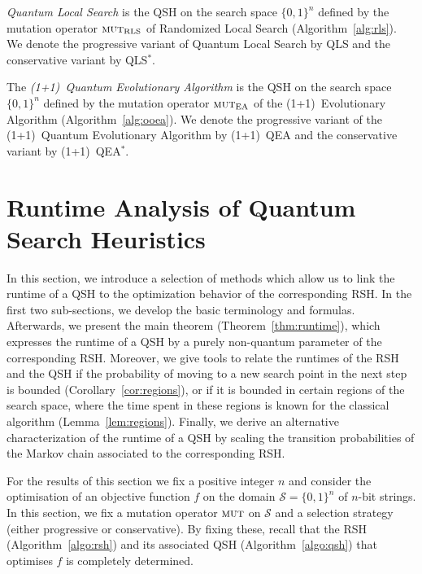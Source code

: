 \documentclass[a4paper,11pt]{article}
\begin{document}
\begin{algorithm}\label{alg:qls}
\emph{Quantum Local Search} is the QSH on the search space $\{0,1\}^n$ defined by the mutation operator $\textsc{mut}_{\mathrm{RLS}}$ of Randomized Local Search (Algorithm~\ref{alg:rls}). We denote the progressive variant of Quantum Local Search by QLS and the conservative variant by QLS$^*$.
\end{algorithm}

\begin{algorithm}\label{alg:ooqea}
The \emph{(1+1)~Quantum Evolutionary Algorithm} is the QSH on the search space $\{0,1\}^n$  defined by the mutation operator $\textsc{mut}_{\mathrm{EA}}$ of the (1+1)~Evolutionary Algorithm (Algorithm~\ref{alg:ooea}). We denote the progressive variant of the (1+1)~Quantum Evolutionary Algorithm by (1+1)~QEA and the conservative variant by (1+1)~QEA$^*$.
 \end{algorithm}

\section{Runtime Analysis of Quantum Search Heuristics}
\label{sec:runtime}

In this section, we introduce a selection of methods which allow us to link the runtime of a QSH to the optimization behavior of the corresponding RSH. In the first two sub-sections, we develop the basic terminology and formulas. Afterwards, we present the main theorem (Theorem~\ref{thm:runtime}), which expresses the runtime of a QSH by a purely non-quantum parameter of the corresponding RSH. Moreover, we give tools to relate the runtimes of the RSH and the QSH if the probability of moving to a new search point in the next step is bounded (Corollary~\ref{cor:regions}), or if it is bounded in certain regions of the search space, where the time spent in these regions is known for the classical algorithm (Lemma~\ref{lem:regions}). Finally, we derive an alternative characterization of the runtime of a QSH by scaling the transition probabilities of the Markov chain associated to the corresponding RSH.


For the results of this section we fix a positive integer $n$ and
consider the optimisation of an objective function $f$ on the domain
$\mathcal{S} = \{0,1\}^n$ of $n$-bit strings. In this section, we fix
a mutation operator $\textsc{mut}$ on $\mathcal{S}$ and a selection strategy
(either progressive or conservative). By fixing these, recall that the
RSH (Algorithm~\ref{algo:rsh}) and its associated QSH
(Algorithm~\ref{algo:qsh}) that optimises $f$ is completely
determined.
\end{document}
